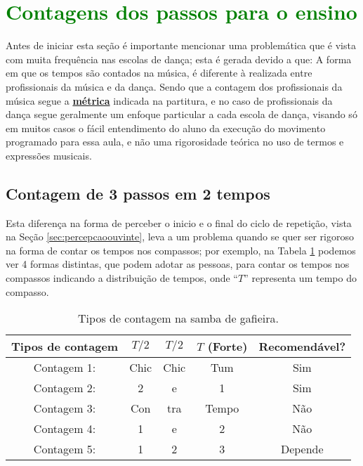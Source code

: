 \section{\textcolor{green}{Contagens dos passos para o ensino}}
Antes de iniciar esta seção é importante mencionar uma
problemática que é vista com muita frequência nas escolas de dança; 
esta é gerada devido a que: A forma em que os tempos são contados 
na música, é
diferente à realizada entre profissionais da música e da dança. 
Sendo que a contagem dos profissionais da música segue a \hyperref[def:Metrica]{\textbf{métrica}} indicada na partitura,
e no caso de profissionais da dança segue geralmente um enfoque 
particular a cada escola de dança, visando só em muitos casos o fácil entendimento do aluno da
execução do movimento programado para essa aula, e não uma rigorosidade teórica no uso de termos e 
expressões musicais.




\subsection{Contagem de 3 passos em 2 tempos}
Esta diferença na forma de perceber o inicio e o final do ciclo de repetição,
vista na Seção \ref{sec:percepcaoouvinte}, 
leva a um problema quando se quer ser rigoroso na forma de contar os tempos nos compassos; 
por exemplo, na Tabela \ref{tab:ritmo1} 
podemos ver 4 formas distintas, que podem adotar as pessoas, 
para contar os tempos nos compassos indicando a distribuição de tempos, 
onde ``$T$'' representa um tempo do compasso.
\begin{table}[ht]
  \centering
  \begin{tabular}    {c|ccc|c}
    \hline
    Tipos de contagem       & $T/2$ & $T/2$   & $T$ (Forte) & Recomendável?\\
    \hline
    Contagem 1: & Chic  & Chic  & Tum   & Sim\\
    Contagem 2: & 2     & e     & 1     & Sim\\ \hline
    Contagem 3: & Con   & tra  & Tempo & Não\\
    Contagem 4: & 1     & e     & 2     & Não\\  \hline
    Contagem 5: & 1     & 2     & 3     & Depende\\ \hline
    \hline
  \end{tabular}
  \caption{Tipos de contagem na samba de gafieira.}
\label{tab:ritmo1}
\end{table}

